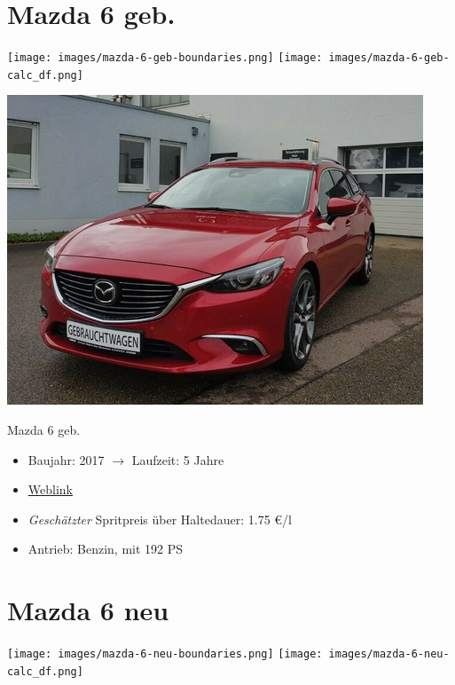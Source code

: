 \documentclass[landscape, DIV=99, 14pt]{scrartcl}
\begin{document}
\pagebreak


\twocolumn

\section*{Mazda 6 geb.}
\begin{center}
\texttt{[image: images/mazda-6-geb-boundaries.png]}
\null
\vspace{0.5cm}
\texttt{[image: images/mazda-6-geb-calc\_df.png]}
\end{center}

\pagebreak
\null
\vspace{2cm}
\begin{center}
\includegraphics[width=0.9\columnwidth]{cars/mazda-6-alt.png}

Mazda 6 geb.
\end{center}

\begin{itemize}
    \item Baujahr: 2017 $\rightarrow$ Laufzeit: 5 Jahre
    \item \href{https://suchen.mobile.de/fahrzeuge/details.html?action=parkItem&id=332186075}{Weblink}
    \item \emph{Gesch\"atzter} Spritpreis \"uber Haltedauer: 1.75 \euro{}/l
    \item Antrieb: Benzin, mit 192 PS
\end{itemize}

\pagebreak


\twocolumn

\section*{Mazda 6 neu}
\begin{center}
\texttt{[image: images/mazda-6-neu-boundaries.png]}
\null
\vspace{0.5cm}
\texttt{[image: images/mazda-6-neu-calc\_df.png]}
\end{center}
\end{document}
